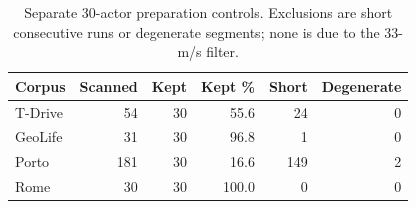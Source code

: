 \begin{table}[t]
\centering
\caption{Separate 30-actor preparation controls. Exclusions are short consecutive
runs or degenerate segments; none is due to the 33-m/s filter.}
\label{tab:workload-preparation}
\footnotesize
\begin{tabular}{@{}lrrrrr@{}}
\toprule
Corpus & Scanned & Kept & Kept \% & Short & Degenerate \\
\midrule
T-Drive & 54 & 30 & 55.6 & 24 & 0 \\
GeoLife & 31 & 30 & 96.8 & 1 & 0 \\
Porto & 181 & 30 & 16.6 & 149 & 2 \\
Rome & 30 & 30 & 100.0 & 0 & 0 \\
\bottomrule
\end{tabular}
\end{table}
